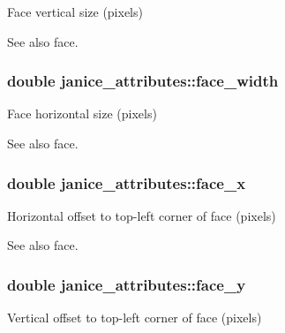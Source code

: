 Face vertical size (pixels) 

\begin{DoxySeeAlso}{See also}
face. 
\end{DoxySeeAlso}
\hypertarget{structjanice__attributes_a52549e9e1e0c09dde986d91787e753ee}{}
\subsubsection[{face\+\_\+width}]{\setlength{\rightskip}{0pt plus 5cm}double janice\+\_\+attributes\+::face\+\_\+width}\label{structjanice__attributes_a52549e9e1e0c09dde986d91787e753ee}


Face horizontal size (pixels) 

\begin{DoxySeeAlso}{See also}
face. 
\end{DoxySeeAlso}
\hypertarget{structjanice__attributes_a62f236e140165065156d71a5bebb427b}{}
\subsubsection[{face\+\_\+x}]{\setlength{\rightskip}{0pt plus 5cm}double janice\+\_\+attributes\+::face\+\_\+x}\label{structjanice__attributes_a62f236e140165065156d71a5bebb427b}


Horizontal offset to top-\/left corner of face (pixels) 

\begin{DoxySeeAlso}{See also}
face. 
\end{DoxySeeAlso}
\hypertarget{structjanice__attributes_a6d1095e735599b4cafb3b28aa674d15a}{}
\subsubsection[{face\+\_\+y}]{\setlength{\rightskip}{0pt plus 5cm}double janice\+\_\+attributes\+::face\+\_\+y}\label{structjanice__attributes_a6d1095e735599b4cafb3b28aa674d15a}


Vertical offset to top-\/left corner of face (pixels) 

